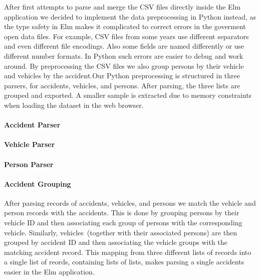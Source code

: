 After first attempts to parse and merge the CSV files directly inside the Elm application we decided to implement the data preprocessing in Python instead, as the type safety in Elm makes it complicated to correct errors in the goverment open data files. For example, CSV files from some years use different separators and even different file encodings. Also some fields are named differently or use different number formats. In Python such errors are easier to debug and work around. By preprocessing the CSV files we also group persons by their vehicle and vehicles by the accident.Our Python preprocessing is structured in three parsers, for accidents, vehicles, and persons. After parsing, the three lists are grouped and exported. A smaller sample is extracted due to memory constraints when loading the dataset in the web browser.

\paragraph{Accident Parser}

\paragraph{Vehicle Parser}

\paragraph{Person Parser}

\paragraph{Accident Grouping}
After parsing records of accidents, vehicles, and persons we match the vehicle and person records with the accidents. This is done by grouping persons by their vehicle ID and then associating each group of persons with the corresponding vehicle.
Similarly, vehicles~(together with their associated persons) are then grouped by accident ID and then associating the vehicle groups with the matching accident record. This mapping from three different lists of records into a single list of reords, containing lists of lists, makes parsing a single accidents easier in the Elm application. 




